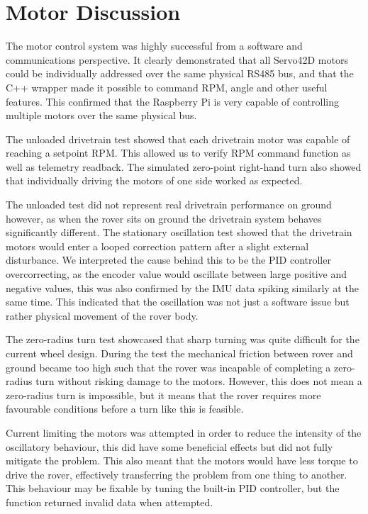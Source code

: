 \section{Motor Discussion}
The motor control system was highly successful from a software and communications perspective. 
It clearly demonstrated that all Servo42D motors could be individually addressed over the same physical RS485 bus, 
and that the C++ wrapper made it possible to command RPM, angle and other useful features. 
This confirmed that the Raspberry Pi is very capable of controlling multiple motors over the same physical bus.

The unloaded drivetrain test showed that each drivetrain motor was capable of reaching a setpoint RPM. This allowed us to verify RPM command function as well as telemetry readback. 
The simulated zero-point right-hand turn also showed that individually driving the motors of one side worked as expected. 

The unloaded test did not represent real drivetrain performance on ground however, as when the rover sits on ground the drivetrain system behaves significantly different.
The stationary oscillation test showed that the drivetrain motors would enter a looped correction pattern after a slight external disturbance.
We interpreted the cause behind this to be the PID controller overcorrecting, as the encoder value would oscillate between large positive and negative values,
this was also confirmed by the IMU data spiking similarly at the same time.
This indicated that the oscillation was not just a software issue but rather physical movement of the rover body.

The zero-radius turn test showcased that sharp turning was quite difficult for the current wheel design. During the test the mechanical friction between rover
and ground became too high such that the rover was incapable of completing a zero-radius turn without risking damage to the motors.
However, this does not mean a zero-radius turn is impossible, but it means that the rover requires more favourable conditions before a turn like this is feasible.

Current limiting the motors was attempted in order to reduce the intensity of the oscillatory behaviour, this did have some beneficial effects but did not fully mitigate the problem. 
This also meant that the motors would have less torque to drive the rover, effectively transferring the problem from one thing to another. 
This behaviour may be fixable by tuning the built-in PID controller, but the function returned invalid data when attempted. 


